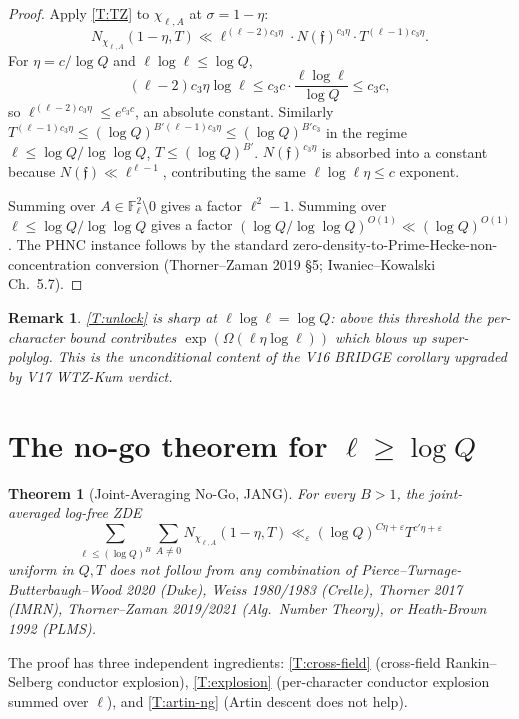 \documentclass[11pt]{article}
\newtheorem{theorem}{Theorem}
\newtheorem{remark}{Remark}
\newcommand{\F}{\mathbb F}
\begin{document}
\begin{proof}
Apply \cref{T:TZ} to $\chi_{\ell,A}$ at $\sigma=1-\eta$:
\[
N_{\chi_{\ell,A}}(1-\eta,T)\ll\ell^{(\ell-2)c_3\eta}\cdot N(\mathfrak f)^{c_3\eta}\cdot T^{(\ell-1)c_3\eta}.
\]
For $\eta=c/\log Q$ and $\ell\log\ell\le\log Q$,
\[
(\ell-2)c_3\eta\log\ell\le c_3 c\cdot\frac{\ell\log\ell}{\log Q}\le c_3 c,
\]
so $\ell^{(\ell-2)c_3\eta}\le e^{c_3 c}$, an absolute constant.  Similarly $T^{(\ell-1)c_3\eta}\le(\log Q)^{B'(\ell-1)c_3\eta}\le(\log Q)^{B'c_3}$ in the regime $\ell\le\log Q/\log\log Q$, $T\le(\log Q)^{B'}$.  $N(\mathfrak f)^{c_3\eta}$ is absorbed into a constant because $N(\mathfrak f)\ll\ell^{\ell-1}$, contributing the same $\ell\log\ell\eta\le c$ exponent.

Summing over $A\in\F_\ell^2\setminus 0$ gives a factor $\ell^2-1$.  Summing over $\ell\le\log Q/\log\log Q$ gives a factor $(\log Q/\log\log Q)^{O(1)}\ll(\log Q)^{O(1)}$.  The PHNC instance follows by the standard zero-density-to-Prime-Hecke-non-concentration conversion (Thorner--Zaman 2019 \S5; Iwaniec--Kowalski Ch.~5.7).
\end{proof}

\begin{remark}
\cref{T:unlock} is sharp at $\ell\log\ell=\log Q$: above this threshold the per-character bound contributes $\exp(\Omega(\ell\eta\log\ell))$ which blows up super-polylog.  This is the unconditional content of the V16 BRIDGE corollary upgraded by V17 WTZ-Kum verdict.
\end{remark}

\section{The no-go theorem for $\ell\ge\log Q$}\label{S:nogo}

\begin{theorem}[Joint-Averaging No-Go, JANG]\label{T:JANG}
For every $B>1$, the joint-averaged log-free ZDE
\[
\sum_{\ell\le(\log Q)^B}\sum_{A\ne 0}N_{\chi_{\ell,A}}(1-\eta,T)\ll_\varepsilon(\log Q)^{C\eta+\varepsilon}T^{c'\eta+\varepsilon}
\]
uniform in $Q,T$ does \emph{not} follow from any combination of Pierce--Turnage-Butterbaugh--Wood 2020 (Duke), Weiss 1980/1983 (Crelle), Thorner 2017 (IMRN), Thorner--Zaman 2019/2021 (Alg.\ Number Theory), or Heath-Brown 1992 (PLMS).
\end{theorem}

The proof has three independent ingredients: \cref{T:cross-field} (cross-field Rankin--Selberg conductor explosion), \cref{T:explosion} (per-character conductor explosion summed over $\ell$), and \cref{T:artin-ng} (Artin descent does not help).
\end{document}
